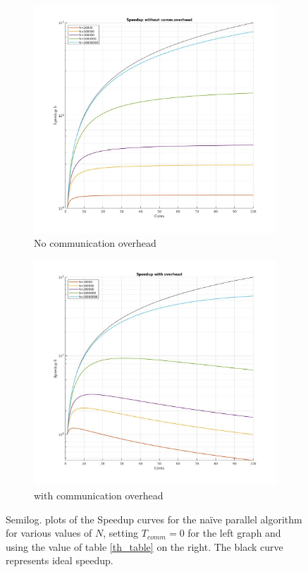 \documentclass{article}
\begin{document}
\begin{figure}[H]
  \begin{subfigure}[b]{0.5\textwidth}
    \includegraphics[width=1.2\textwidth]{th_scaling_0}
    \caption{No communication overhead}
    \label{th_speedup_1a}
  \end{subfigure}
  \begin{subfigure}[b]{0.5\textwidth}
    \includegraphics[width=1.2\textwidth]{th_scaling_1}
    \caption{with communication overhead}
    \label{th_speedup_1b}
  \end{subfigure}
  \caption{Semilog. plots of the Speedup curves for the na\"ive parallel algorithm for various values of $N$, setting $T_{comm}=0$ for the left graph and using the value of table \ref{th_table} on the right. The black curve represents ideal speedup.}
  \label{th_speedup_1}
\end{figure}
\end{document}

